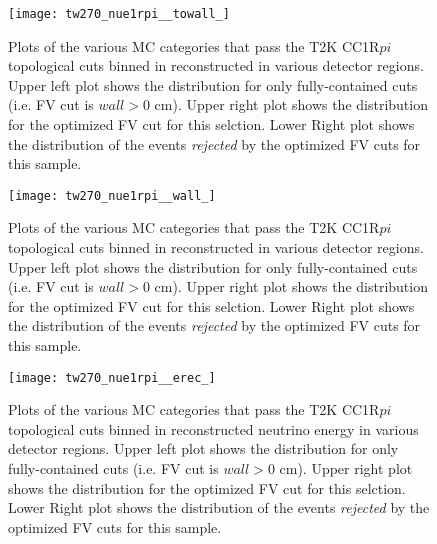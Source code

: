\begin{figure}[h]
  \begin{center}
    \texttt{[image: tw270\_nue1rpi\_\_towall\_]}
  \end{center}
  \caption{Plots of the various MC categories that pass the T2K  \nue CC1R$pi$
  topological cuts binned in reconstructed \towall in various detector regions. Upper left
  plot shows the distribution for only fully-contained cuts (i.e. FV cut is \@ $wall > 0$ cm).
  Upper right plot shows the distribution for the optimized FV cut for this selction.
  Lower Right plot shows the distribution of the events \emph{rejected} by the optimized
  FV cuts for this sample.
  }
  \label{fig:compnue1rpitowall}
\end{figure}


\begin{figure}[h]
  \begin{center}
    \texttt{[image: tw270\_nue1rpi\_\_wall\_]}
  \end{center}
  \caption{Plots of the various MC categories that pass the T2K \nue CC1R$pi$
  topological cuts binned in reconstructed \wall in various detector regions. Upper left plot
  shows the distribution for only fully-contained cuts (i.e. FV cut is \@ $wall
  > 0$ cm).  Upper right plot shows the distribution for the optimized FV cut
  for this selction.  Lower Right plot shows the distribution of the events
  \emph{rejected} by the optimized FV cuts for this sample.
  }
  \label{fig:compnue1rpiwall}
\end{figure}


\begin{figure}[h]
  \begin{center}
    \texttt{[image: tw270\_nue1rpi\_\_erec\_]}
  \end{center}
  \caption{Plots of the various MC categories that pass the T2K \nue CC1R$pi$
  topological cuts binned in reconstructed neutrino energy in various detector
  regions. Upper left plot shows the distribution for only fully-contained cuts
  (i.e. FV cut is \@ $wall > 0$ cm).  Upper right plot shows the distribution
  for the optimized FV cut for this selction.  Lower Right plot shows the
  distribution of the events \emph{rejected} by the optimized FV cuts for this
  sample.
  }
  \label{fig:compnue1rpierec}
\end{figure}

